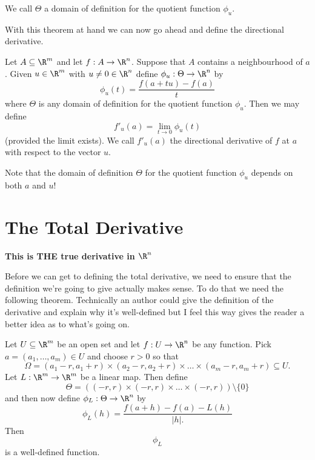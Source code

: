 			\begin{remark}
				We call $\Theta$ a domain of definition for the quotient function $\phi_u$.
			\end{remark}
		
		With this theorem at hand we can now go ahead and define the directional derivative.
		
		\begin{definition}
			Let $A \subseteq \R^m$ and let $f : A \to \R^n$. Suppose that $A$ contains a neighbourhood of $a$. Given $u \in \R^m$ with $u  \neq 0 \in \R^n$ define $\phi_u : \Theta \to \R^n$  by $$\phi_u(t) = \frac{f(a+tu)-f(a)}{t}$$ where $\Theta$ is any domain of definition for the quotient function $\phi_u$. Then we may define $$f'_u(a) = \lim_{t \to 0} \phi_u(t)$$ (provided the limit exists). We call $f'_u(a)$ the directional derivative of $f$ at $a$ with respect to the vector $u$.
		\end{definition}
		
		
		\begin{remark}
			Note that the domain of definition $\Theta$ for the quotient function $\phi_u$ depends on both $a$ and $u$!
		\end{remark}

		
		
		
		
		\newpage
		
		\section{The Total Derivative}
		
		\bigskip
		
	
		\medskip
		\textbf{This is THE true derivative in $\R^n$}
		\\

		\bigskip
		
		Before we can get to defining the total derivative, we need to ensure that the definition we're going to give actually makes sense. To do that we need the following theorem. Technically an author could give the definition of the derivative and explain why it's well-defined but I feel this way gives the reader a better idea as to what's going on.
		
		\begin{theorem}
			Let $U \subseteq \R^m$ be an open set and let $f : U \to \R^n$ be any function. Pick $a = (a_1, \dots, a_m) \in U$ and choose $r > 0$ so that $$\Omega = \left(a_1 - r, a_1 + r \right) \times \left(a_2 - r, a_2 + r \right) \times \dots \times \left(a_m - r, a_m + r \right)   \subseteq U.$$ Let $L : \R^m \to \R^m$ be a linear map. Then define $$\Theta = \left((-r, r) \times (-r, r) \times \dots \times (-r, r) \right) \setminus \{0\}$$  and then now define $\phi_L : \Theta \to \R^n$ by $$\phi_L(h) = \frac{f(a+h) - f(a) - L(h)}{|h|.}$$ Then $$\phi_L$$ is a well-defined function.
		\end{theorem}
		
